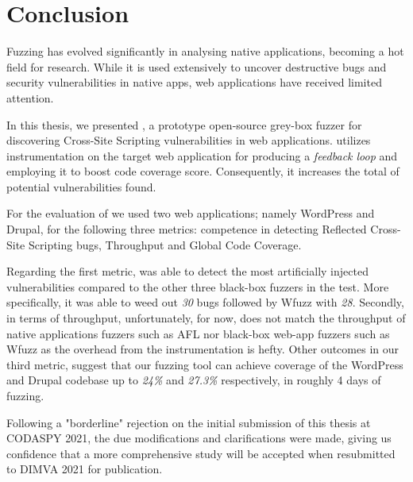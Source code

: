 \chapter{Conclusion}
\label{sec:conclusion}
\vspace*{0.25cm}

Fuzzing has evolved significantly in analysing native applications, becoming a hot field for research. While it is used extensively to uncover destructive bugs and security vulnerabilities in native apps, web applications have received limited attention.

In this thesis, we presented \pname{}, a prototype open-source grey-box fuzzer for discovering Cross-Site Scripting vulnerabilities in web applications. \pname{} utilizes instrumentation on the target web application for producing a \emph{feedback loop} and employing it to boost code coverage score. Consequently, it increases the total of potential vulnerabilities found.

For the evaluation of \pname{} we used two web applications; namely WordPress and Drupal, for the following three metrics: competence in detecting Reflected Cross-Site Scripting bugs, Throughput and Global Code Coverage.

Regarding the first metric, \pname{} was able to detect the most artificially injected vulnerabilities compared to the other three black-box fuzzers in the test. More specifically, it was able to weed out \emph{30} bugs followed by Wfuzz with \emph{28}. Secondly, in terms of throughput, unfortunately, for now, \pname{} does not match the throughput of native applications fuzzers such as AFL nor black-box web-app fuzzers such as Wfuzz as the overhead from the instrumentation is hefty. Other outcomes in our third metric, suggest that our fuzzing tool can achieve coverage of the WordPress and Drupal codebase up to \emph{24\%} and \emph{27.3\%} respectively, in roughly 4 days of fuzzing.

Following a "borderline" rejection on the initial submission of this thesis at CODASPY 2021, the due modifications and clarifications were made, giving us confidence that a more comprehensive study will be accepted when resubmitted to DIMVA 2021 for publication.